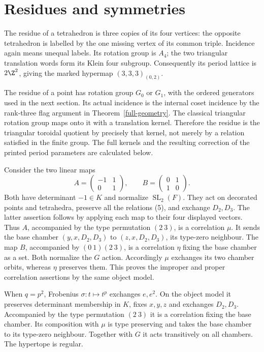 \section{Residues and symmetries}

The residue of a tetrahedron is three copies of its four vertices:
the opposite tetrahedron is labelled by the one missing vertex
of its common triple. Incidence again means unequal labels.
Its rotation group is $A_4$; the two triangular translation words
form its Klein four subgroup. Consequently its period lattice
is $2\Z^2$, giving the marked hypermap $(3,3,3)_{(0,2)}$.

The residue of a point has rotation group $G_0$ or $G_1$, with
the ordered generators used in the next section. Its actual
incidence is the internal coset incidence by the rank-three flag
argument in Theorem~\ref{full-geometry}. The classical triangular
rotation group maps onto it with a translation kernel. Therefore
the residue is the triangular toroidal quotient by precisely that
kernel, not merely by a relation satisfied in the finite group.
The full kernels and the resulting correction of the printed
period parameters are calculated below.

Consider the two linear maps
\[
       A=\begin{pmatrix}-1&1\\0&1\end{pmatrix},\qquad
       B=\begin{pmatrix}0&1\\1&0\end{pmatrix}.
\]
Both have determinant $-1\in K$ and normalize $\operatorname{SL}_2(F)$.
They act on decorated points and tetrahedra, preserve all the
relations (5), and exchange $D_2,D_3$. The latter assertion
follows by applying each map to their four displayed vectors.
Thus $A$, accompanied by the type permutation $(2\ 3)$, is a
correlation $\mu$. It sends the base chamber
$(y,x,D_2,D_3)$ to $(z,x,D_2,D_3)$, its type-zero neighbour.
The map $B$, accompanied by $(0\ 1)(2\ 3)$, is a correlation
$\eta$ fixing the base chamber as a set. Both normalize the
$G$ action. Accordingly $\mu$ exchanges its two chamber orbits,
whereas $\eta$ preserves them. This proves the improper and
proper correlation assertions by the same object model.

When $q=p^2$, Frobenius $\sigma:t\mapsto t^p$ exchanges $e,e^2$.
On the object model it preserves determinant membership in $K$,
fixes $x,y,z$ and exchanges $D_2,D_3$. Accompanied by the type
permutation $(2\ 3)$ it is a correlation fixing the base chamber.
Its composition with $\mu$ is type preserving and takes the base
chamber to its type-zero neighbour. Together with $G$ it acts
transitively on all chambers. The hypertope is regular.

